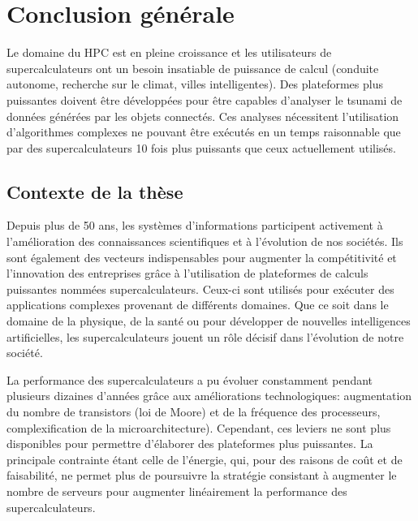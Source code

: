 \chapter{Conclusion générale}
\label{chap:conclusion}
\glsresetall

      
         
        Le domaine du \gls{HPC} est en pleine croissance et les utilisateurs de supercalculateurs ont un besoin insatiable de puissance de calcul (conduite autonome, recherche sur le climat, villes intelligentes). Des plateformes plus puissantes doivent être développées pour être capables d'analyser le tsunami de données générées par les objets connectés. Ces analyses nécessitent l'utilisation d'algorithmes complexes ne pouvant être exécutés en un temps raisonnable que par des supercalculateurs 10 fois plus puissants que ceux actuellement utilisés. 

\section{Contexte de la thèse}
        
    
    
        Depuis plus de 50 ans, les systèmes d’informations participent activement à l’amélioration des connaissances scientifiques et à l’évolution de nos sociétés. Ils sont également des vecteurs indispensables pour augmenter la compétitivité et l’innovation des entreprises grâce à l'utilisation de plateformes de calculs puissantes nommées supercalculateurs. Ceux-ci sont utilisés pour exécuter des applications complexes provenant de différents domaines. Que ce soit dans le domaine de la physique, de la santé ou pour développer de nouvelles intelligences artificielles, les supercalculateurs jouent un rôle décisif dans l'évolution de notre société.
      
    
        
        La performance des supercalculateurs a pu évoluer constamment pendant plusieurs dizaines d'années grâce aux améliorations technologiques: augmentation du nombre de transistors (loi de Moore) et de la fréquence des processeurs, complexification de la microarchitecture). Cependant, ces leviers ne sont plus disponibles pour permettre d'élaborer des plateformes plus puissantes. La principale contrainte étant celle de l'énergie, qui, pour des raisons de coût et de faisabilité, ne permet plus de poursuivre la stratégie consistant à augmenter le nombre de serveurs pour augmenter linéairement la performance des supercalculateurs. 


